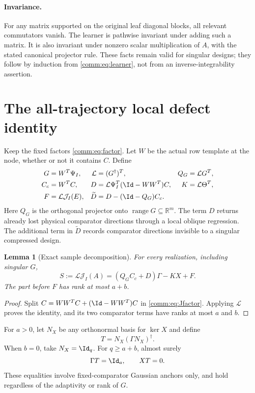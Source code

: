 \documentclass[11pt,oneside,openany,a4paper]{book}
\numberwithin{equation}{chapter}
\newtheorem{lemma}[theorem]{Lemma}
\theoremstyle{definition}
\theoremstyle{remark}
\newcommand{\R}{\mathbb R}\newcommand{\E}{\mathbb E}\newcommand{\Prb}{\mathbb P}\newcommand{\PP}{\mathbb P}
\DeclareMathOperator{\ran}{range}\DeclareMathOperator{\OPT}{OPT}
\newcommand{\J}{\mathcal J}\newcommand{\transpose}{\mathsf T}
\begin{document}
\paragraph{Invariance.}
For any matrix supported on the original leaf diagonal blocks, all relevant commutators vanish. The learner is pathwise invariant under adding such a matrix. It is also invariant under nonzero scalar multiplication of $A$, with the stated canonical projector rule. These facts remain valid for singular designs; they follow by induction from \eqref{comm:eq:learner}, not from an inverse-integrability assertion.

\section{The all-trajectory local defect identity}
Keep the fixed factors \eqref{comm:eq:factor}. Let $W$ be the actual row template at the node, whether or not it contains $C$. Define
\begin{align}
 G&=W^T\Psi_I,& \mathcal L&=(G^\dagger)^T,& Q_G&=\mathcal L G^T,\\
 C_c&=W^TC,& D&=\mathcal L\Psi_I^T(\Id-WW^T)C,&
 K&=\mathcal L\Theta^T,\\
 F&=\mathcal L\J_I(E),&
 \widetilde D&=D-(\Id-Q_G)C_c.\label{comm:eq:defs}
\end{align}
Here $Q_G$ is the orthogonal projector onto $\ran G\subseteq\R^m$. The term $D$ returns already lost physical comparator directions through a local oblique regression. The additional term in $\widetilde D$ records comparator directions invisible to a singular compressed design.

\begin{lemma}[Exact sample decomposition]\label{comm:lem:sample}
For every realization, including singular $G$,
\begin{equation}\label{comm:eq:sample}
 \boxed{S:=\mathcal L\J_I(A)=(Q_GC_c+D)\Gamma-KX+F.}
\end{equation}
The part before $F$ has rank at most $a+b$.
\end{lemma}
\begin{proof}
Split $C=WW^TC+(\Id-WW^T)C$ in \eqref{comm:eq:Jfactor}. Applying $\mathcal L$ proves the identity, and its two comparator terms have ranks at most $a$ and $b$.
\end{proof}

For $a>0$, let $N_X$ be any orthonormal basis for $\ker X$ and define
\begin{equation}\label{comm:eq:T}
 T=N_X(\Gamma N_X)^\dagger.
\end{equation}
When $b=0$, take $N_X=\Id_q$. For $q\ge a+b$, almost surely
\begin{equation}\label{comm:eq:ann}
 \Gamma T=\Id_a,\qquad XT=0.
\end{equation}
These equalities involve fixed-comparator Gaussian anchors only, and hold regardless of the adaptivity or rank of $G$.
\end{document}
